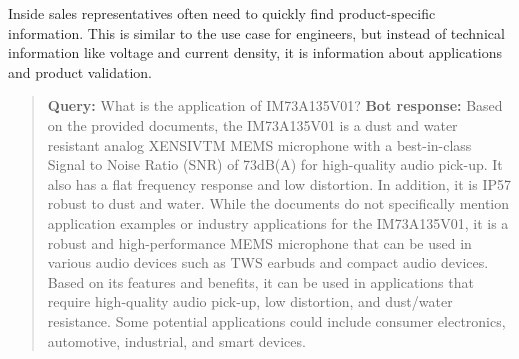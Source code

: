 \documentclass{article}
\begin{document}
Inside sales representatives often need to quickly find product-specific information. This is similar to the use case for engineers, but instead of technical information like voltage and current density, it is information about applications and product validation.
\begin{quote}
\textbf{Query:} What is the application of IM73A135V01? \newline
\textbf{Bot response: } Based on the provided documents, the IM73A135V01 is a dust and water resistant analog XENSIVTM MEMS microphone with a best-in-class Signal to Noise Ratio (SNR) of 73dB(A) for high-quality audio pick-up. It also has a flat frequency response and low distortion. In addition, it is IP57 robust to dust and water. While the documents do not specifically mention application examples or industry applications for the IM73A135V01, it is a robust and high-performance MEMS microphone that can be used in various audio devices such as TWS earbuds and compact audio devices. Based on its features and benefits, it can be used in applications that require high-quality audio pick-up, low distortion, and dust/water resistance. Some potential applications could include consumer electronics, automotive, industrial, and smart devices. \newline
\end{quote}
\end{document}
